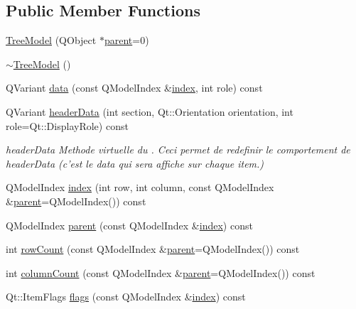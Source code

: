 \subsection*{Public Member Functions}
\begin{DoxyCompactItemize}
\item 
\hyperlink{class_tree_model_a128d1d9d72775d1dfd3be4632c794ce3}{Tree\-Model} (Q\-Object $\ast$\hyperlink{class_tree_model_a210d05503fb8758b7bad1c4fd4c5ae6b}{parent}=0)
\item 
\hyperlink{class_tree_model_af0998d55a63c2b18be1f03e4e8567926}{$\sim$\-Tree\-Model} ()
\item 
Q\-Variant \hyperlink{class_tree_model_aa9d2620ed71a36c3402a56de1ac51f88}{data} (const Q\-Model\-Index \&\hyperlink{class_tree_model_a2efaf132fe0622813075346d60129ae9}{index}, int role) const 
\item 
Q\-Variant \hyperlink{class_tree_model_a75a707dfa6c5bd8431434ceda27f06d0}{header\-Data} (int section, Qt\-::\-Orientation orientation, int role=Qt\-::\-Display\-Role) const 
\begin{DoxyCompactList}\small\item\em header\-Data Methode virtuelle du . Ceci permet de redefinir le comportement de header\-Data (c'est le data qui sera affiche sur chaque item.) \end{DoxyCompactList}\item 
Q\-Model\-Index \hyperlink{class_tree_model_a2efaf132fe0622813075346d60129ae9}{index} (int row, int column, const Q\-Model\-Index \&\hyperlink{class_tree_model_a210d05503fb8758b7bad1c4fd4c5ae6b}{parent}=Q\-Model\-Index()) const 
\item 
Q\-Model\-Index \hyperlink{class_tree_model_a210d05503fb8758b7bad1c4fd4c5ae6b}{parent} (const Q\-Model\-Index \&\hyperlink{class_tree_model_a2efaf132fe0622813075346d60129ae9}{index}) const 
\item 
int \hyperlink{class_tree_model_a41ad83cee4891ae9f3c71960cd27bb24}{row\-Count} (const Q\-Model\-Index \&\hyperlink{class_tree_model_a210d05503fb8758b7bad1c4fd4c5ae6b}{parent}=Q\-Model\-Index()) const 
\item 
int \hyperlink{class_tree_model_a53225feea015d80b2e025d401ae163b4}{column\-Count} (const Q\-Model\-Index \&\hyperlink{class_tree_model_a210d05503fb8758b7bad1c4fd4c5ae6b}{parent}=Q\-Model\-Index()) const 
\item 
Qt\-::\-Item\-Flags \hyperlink{class_tree_model_ac087eed438ffc3d2bb1212dd5cdabc05}{flags} (const Q\-Model\-Index \&\hyperlink{class_tree_model_a2efaf132fe0622813075346d60129ae9}{index}) const 

\end{DoxyCompactItemize}
